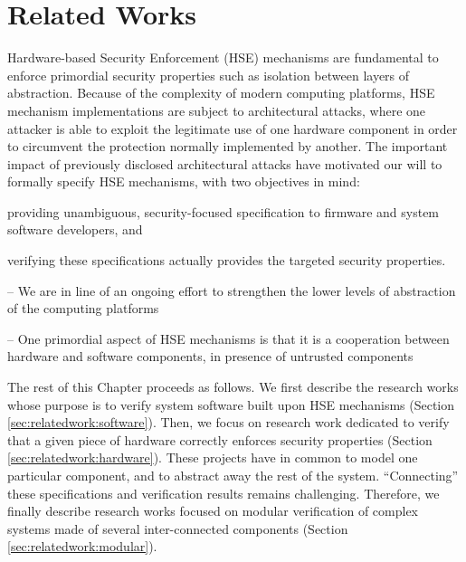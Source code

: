 \chapter{Related Works}
\label{chapter:relatedwork}

Hardware-based Security Enforcement (HSE) mechanisms are fundamental to enforce
primordial security properties such as isolation between layers of abstraction.
%
Because of the complexity of modern computing platforms, HSE mechanism
implementations are subject to architectural attacks, where one attacker is able
to exploit the legitimate use of one hardware component in order to circumvent
the protection normally implemented by another.
%
The important impact of previously disclosed architectural attacks have
motivated our will to formally specify HSE mechanisms, with two objectives in
mind:
%
\begin{inparaenum}[(1)]
\item providing unambiguous, security-focused specification to firmware and
  system software developers, and
%
\item verifying these specifications actually provides the targeted security
  properties.
\end{inparaenum}

\begin{compactitem}
\item[--] We are in line of an ongoing effort to strengthen the lower levels of
  abstraction of the computing
  platforms\,\cite{potlapally2011hardwaresecurity,chong2016report}
\item[--] One primordial aspect of HSE mechanisms is that it is a cooperation
  between hardware and software components, in presence of untrusted components
\end{compactitem}

The rest of this Chapter proceeds as follows.
%
We first describe the research works whose purpose is to verify system software
built upon HSE mechanisms (Section\,\ref{sec:relatedwork:software}).
%
Then, we focus on research work dedicated to verify that a given piece of
hardware correctly enforces security properties
(Section\,\ref{sec:relatedwork:hardware}).
%
These projects have in common to model one particular component, and to abstract
away the rest of the system.
%
``Connecting'' these specifications and verification results remains
challenging.
%
Therefore, we finally describe research works focused on modular verification of
complex systems made of several inter-connected components
(Section\,\ref{sec:relatedwork:modular}).

